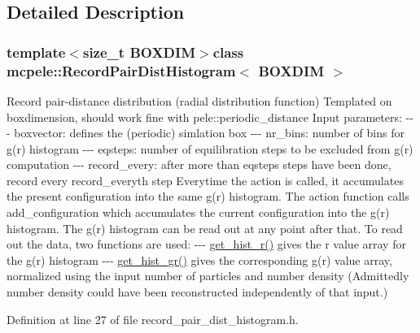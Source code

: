 \subsection{\-Detailed \-Description}
\subsubsection*{template$<$size\-\_\-t \-B\-O\-X\-D\-I\-M$>$class mcpele\-::\-Record\-Pair\-Dist\-Histogram$<$ B\-O\-X\-D\-I\-M $>$}

\-Record pair-\/distance distribution (radial distribution function) \-Templated on boxdimension, should work fine with pele\-::periodic\-\_\-distance \-Input parameters\-: -\/-\/-\/ boxvector\-: defines the (periodic) simlation box -\/-\/-\/ nr\-\_\-bins\-: number of bins for g(r) histogram -\/-\/-\/ eqsteps\-: number of equilibration steps to be excluded from g(r) computation -\/-\/-\/ record\-\_\-every\-: after more than eqsteps steps have been done, record every record\-\_\-everyth step \-Everytime the action is called, it accumulates the present configuration into the same g(r) histogram. \-The action function calls add\-\_\-configuration which accumulates the current configuration into the g(r) histogram. \-The g(r) histogram can be read out at any point after that. \-To read out the data, two functions are used\-: -\/-\/-\/ \hyperlink{classmcpele_1_1RecordPairDistHistogram_a33de592d9288de540fc56edfecfbc8f1}{get\-\_\-hist\-\_\-r()} gives the r value array for the g(r) histogram -\/-\/-\/ \hyperlink{classmcpele_1_1RecordPairDistHistogram_ae8e88de17c1654b06412b73b1f9ad9e0}{get\-\_\-hist\-\_\-gr()} gives the corresponding g(r) value array, normalized using the input number of particles and number density (\-Admittedly number density could have been reconstructed independently of that input.) 

\-Definition at line 27 of file record\-\_\-pair\-\_\-dist\-\_\-histogram.\-h.



